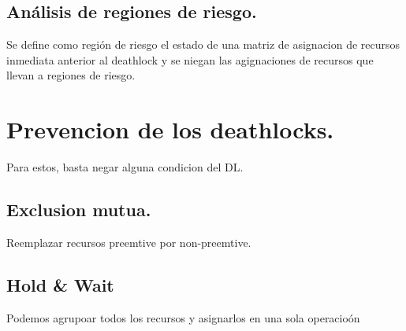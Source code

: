 \subsection{An\'{a}lisis de regiones de riesgo.}
Se define como regi\'{o}n de riesgo el estado de una matriz de asignacion de recursos inmediata anterior al deathlock y se niegan las agignaciones de recursos que llevan a regiones de riesgo.\\

\section{Prevencion de los deathlocks.}
Para estos, basta negar alguna condicion del DL.

\subsection{Exclusion mutua.} Reemplazar recursos preemtive por non-preemtive.\\
\subsection{Hold \& Wait} Podemos agrupoar todos los recursos y asignarlos en una sola operacio\'{o}n\\


